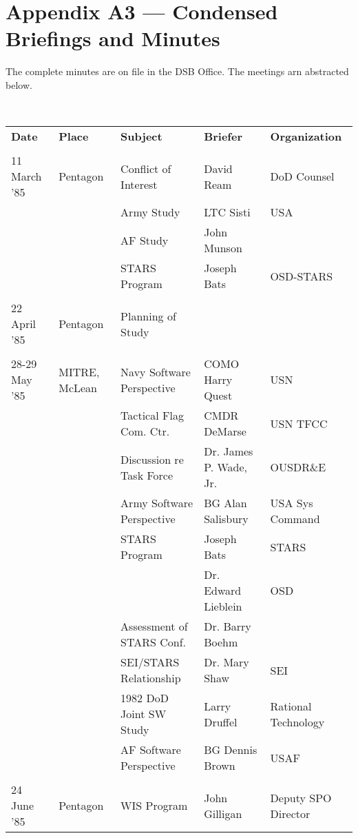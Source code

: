 \documentclass[12pt]{article}
\begin{document}
\newpage

\section*{Appendix A3 — Condensed Briefings and Minutes}


The complete minutes are on file in the DSB Office. The meetings arn abstracted
below.

~

\noindent
\begin{footnotesize}
\begin{tabular}{ l l l l l }
\textbf{Date} & \textbf{Place} & \textbf{Subject} & \textbf{Briefer} & \textbf{Organization}\\
\\
11 March '85 & Pentagon & Conflict of Interest & David Ream & DoD Counsel\\
    & & Army Study    & LTC Sisti & USA \\
    & & AF Study      & John Munson & \\
    & & STARS Program & Joseph Bats & OSD-STARS \\
\\
    22 April '85 & Pentagon & Planning of Study\\
\\
    28-29 May '85 & MITRE, McLean & Navy Software Perspective         & COMO Harry Quest & USN\\
    & & Tactical Flag Com. Ctr.      & CMDR DeMarse     & USN TFCC\\
    & & Discussion re Task Force     & Dr. James P. Wade, Jr. &  OUSDR\&E\\
    & & Army Software Perspective    & BG Alan Salisbury     & USA Sys Command\\
    & & STARS Program                & Joseph Bats           & STARS\\
    & &                              & Dr. Edward Lieblein   & OSD\\
    & & Assessment of STARS Conf.    & Dr. Barry Boehm & \\
    & & SEI/STARS Relationship       & Dr. Mary Shaw& SEI \\
    & & 1982 DoD Joint SW Study      & Larry Druffel & Rational Technology\\
    & & AF Software Perspective      & BG Dennis Brown & USAF\\
\\
    24 June '85 & Pentagon  & WIS Program & John Gilligan     & Deputy SPO Director\\

\end{tabular}
\end{footnotesize}
\end{document}

